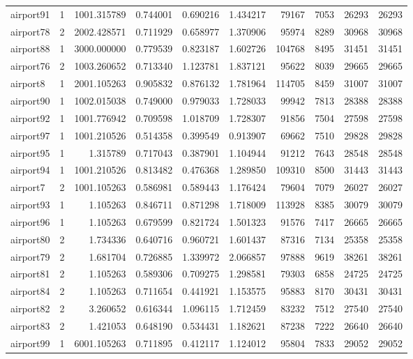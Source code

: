 \documentclass[../../../thesis.tex]{subfiles}
\begin{document}
\begin{longtable}{|l|r|r|r|r|r|r|r|r|r|}
airport91 & 1 & 1001.315789 & 0.744001 & 0.690216 & 1.434217 & 79167 & 7053 & 26293 & 26293 \\
airport78 & 2 & 2002.428571 & 0.711929 & 0.658977 & 1.370906 & 95974 & 8289 & 30968 & 30968 \\
airport88 & 1 & 3000.000000 & 0.779539 & 0.823187 & 1.602726 & 104768 & 8495 & 31451 & 31451 \\
airport76 & 2 & 1003.260652 & 0.713340 & 1.123781 & 1.837121 & 95622 & 8039 & 29665 & 29665 \\
airport8 & 1 & 2001.105263 & 0.905832 & 0.876132 & 1.781964 & 114705 & 8459 & 31007 & 31007 \\
airport90 & 1 & 1002.015038 & 0.749000 & 0.979033 & 1.728033 & 99942 & 7813 & 28388 & 28388 \\
airport92 & 1 & 1001.776942 & 0.709598 & 1.018709 & 1.728307 & 91856 & 7504 & 27598 & 27598 \\
airport97 & 1 & 1001.210526 & 0.514358 & 0.399549 & 0.913907 & 69662 & 7510 & 29828 & 29828 \\
airport95 & 1 & 1.315789 & 0.717043 & 0.387901 & 1.104944 & 91212 & 7643 & 28548 & 28548 \\
airport94 & 1 & 1001.210526 & 0.813482 & 0.476368 & 1.289850 & 109310 & 8500 & 31443 & 31443 \\
airport7 & 2 & 1001.105263 & 0.586981 & 0.589443 & 1.176424 & 79604 & 7079 & 26027 & 26027 \\
airport93 & 1 & 1.105263 & 0.846711 & 0.871298 & 1.718009 & 113928 & 8385 & 30079 & 30079 \\
airport96 & 1 & 1.105263 & 0.679599 & 0.821724 & 1.501323 & 91576 & 7417 & 26665 & 26665 \\
airport80 & 2 & 1.734336 & 0.640716 & 0.960721 & 1.601437 & 87316 & 7134 & 25358 & 25358 \\
airport79 & 2 & 1.681704 & 0.726885 & 1.339972 & 2.066857 & 97888 & 9619 & 38261 & 38261 \\
airport81 & 2 & 1.105263 & 0.589306 & 0.709275 & 1.298581 & 79303 & 6858 & 24725 & 24725 \\
airport84 & 2 & 1.105263 & 0.711654 & 0.441921 & 1.153575 & 95883 & 8170 & 30431 & 30431 \\
airport82 & 2 & 3.260652 & 0.616344 & 1.096115 & 1.712459 & 83232 & 7512 & 27540 & 27540 \\
airport83 & 2 & 1.421053 & 0.648190 & 0.534431 & 1.182621 & 87238 & 7222 & 26640 & 26640 \\
airport99 & 1 & 6001.105263 & 0.711895 & 0.412117 & 1.124012 & 95804 & 7833 & 29052 & 29052 \\

\end{longtable}
\end{document}
